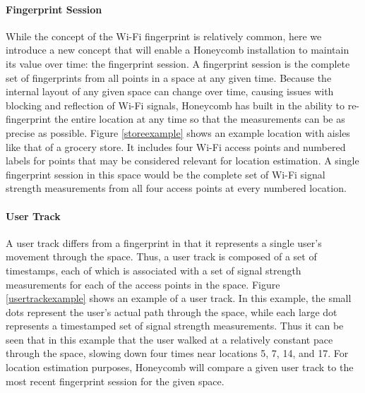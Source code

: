 \paragraph{Fingerprint Session}

While the concept of the Wi-Fi fingerprint is relatively common, here we introduce a new concept that will enable a Honeycomb installation to maintain its value over time: the fingerprint session. A fingerprint session is the complete set of fingerprints from all points in a space at any given time. Because the internal layout of any given space can change over time, causing issues with blocking and reflection of Wi-Fi signals, Honeycomb has built in the ability to re-fingerprint the entire location at any time so that the measurements can be as precise as possible. Figure \ref{storeexample} shows an example location with aisles like that of a grocery store. It includes four Wi-Fi access points and numbered labels for points that may be considered relevant for location estimation. A single fingerprint session in this space would be the complete set of Wi-Fi signal strength measurements from all four access points at every numbered location. 


\paragraph{User Track}
A user track differs from a fingerprint in that it represents a single user's movement through the space. Thus, a user track is composed of a set of timestamps, each of which is associated with a set of signal strength measurements for each of the access points in the space. Figure \ref{usertrackexample} shows an example of a user track. In this example, the small dots represent the user's actual path through the space, while each large dot represents a timestamped set of signal strength measurements. Thus it can be seen that in this example that the user walked at a relatively constant pace through the space, slowing down four times near locations 5, 7, 14, and 17. For location estimation purposes, Honeycomb will compare a given user track to the most recent fingerprint session for the given space. 


